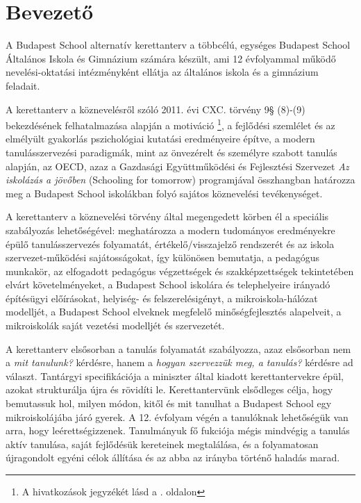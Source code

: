 \chapter{Bevezető}
A Budapest School alternatív kerettanterv a többcélú, egységes  Budapest School Általános Iskola és Gimnázium számára készült, ami 12 évfolyammal működő nevelési-oktatási intézményként ellátja az általános iskola és a gimnázium feladait. 

A kerettanterv a köznevelésről szóló 2011. évi CXC. törvény 9§ (8)-(9) bekezdésének felhatalmazása alapján a motiváció \cite{pink2011drive}\footnote{A hivatkozások jegyzékét lásd a \pageref{sec:bibliographyk}. oldalon}, a fejlődési szemlélet \cite{growthmindset} és az elmélyült gyakorlás \cite{ericsson2016peak}  pszichológiai kutatási eredményeire építve, 
a modern tanulásszervezési paradigmák, mint az önvezérelt \cite{mitra2012beyond} és személyre szabott \cite{khan2012one} tanulás alapján,
az  OECD, azaz a Gazdasági Együttműködési és Fejlesztési Szervezet \emph{Az iskolázás a jövőben}  (Schooling for tomorrow) programjával összhangban \cite{2006schooling}
határozza meg a Budapest School iskolákban folyó sajátos köznevelési tevékenységet.


A kerettanterv a köznevelési törvény által megengedett körben él a speciális szabályozás lehetőségével: meghatározza a modern tudományos eredményekre épülő tanulásszervezés folyamatát, értékelő/visszajelző rendszerét és az iskola szervezet-működési sajátosságokat, így különösen bemutatja, a pedagógus munkakör, az elfogadott pedagógus végzettségek és szakképzettségek tekintetében elvárt követelményeket, a Budapest School iskolára és telephelyeire irányadó építésügyi előírásokat, helyiség- és felszerelésigényt, a mikroiskola-hálózat modelljét, a Budapest School elveknek megfelelő minőségfejlesztés alapelveit, a mikroiskolák saját vezetési modelljét és szervezetét.

A kerettanterv elsősorban a tanulás folyamatát szabályozza, azaz elsősorban nem a \emph{mit tanulunk?} kérdésre, hanem a \emph{hogyan szervezzük meg, a tanulás?} kérdésre ad választ. Tantárgyi specifikációja a miniszter által kiadott kerettantervekre\cite{ofi:kerettanterv} épül, azokat strukturálja újra és rövidíti le. Kerettantervünk elsődleges célja, hogy bemutassuk hol, milyen módon, kitől és mit tanulhat a Budapest School egy mikroiskolájába járó gyerek. A 12. évfolyam végén a tanulóknak lehetőségük van arra, hogy leérettségizzenek. Tanulmányuk fő fukciója mégis mindvégig a tanulás aktív tanulása, saját fejlődésük kereteinek megtalálása, és a folyamatosan újragondolt egyéni célok állítása és az abba az irányba történő haladás marad.


